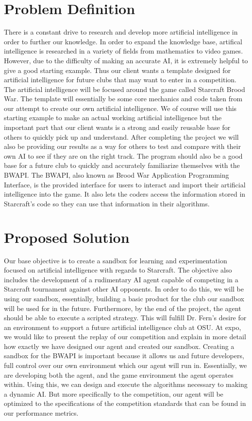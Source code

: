 \documentclass[10pt,letterpaper,onecolumn,draftclsnofoot]{IEEEtran}
\begin{document}
\section{Problem Definition}
There is a constant drive to research and develop more artificial intelligence in order to further our knowledge. In order to expand the knowledge base, artifical intelligence is researched in a variety of fields from mathematics to video games. However, due to the difficulty of making an accurate AI, it is extremely helpful to give a good starting example. Thus our client wants a template designed for artificial intelligence for future clubs that may want to enter in a competition. The artificial intelligence will be focused around the game called Starcraft Brood War. The template will essentially be some core mechanics and code taken from our attempt to create our own artificial intelligence. We of course will use this starting example to make an actual working artificial intelligence but the important part that our client wants is a strong and easily reusable base for others to quickly pick up and understand. After completing the project we will also be providing our results as a way for others to test and compare with their own AI to see if they are on the right track. The program should also be a good base for a future club to quickly and accurately familiarize themselves with the BWAPI. The BWAPI, also known as Brood War Application Programming Interface, is the provided interface for users to interact and import their artificial intelligence into the game. It also lets the coders access the information stored in Starcraft's code so they can use that information in their algorithms.

\section{Proposed Solution}
Our base objective is to create a sandbox for learning and experimentation focused on artificial intelligence with regards to Starcraft. The objective also includes the development of a rudimentary AI agent capable of competing in a Starcraft tournament against other AI opponents. In order to do this, we will be using our sandbox, essentially, building a basic product for the club our sandbox will be used for in the future. Furthermore, by the end of the project, the agent should be able to execute a scripted strategy. This will fulfill Dr. Fern's desire for an environment to support a future artificial intelligence club at OSU. At expo, we would like to present the replay of our competition and explain in more detail how exactly we have designed our agent and created our sandbox.
Creating a sandbox for the BWAPI is important because it allows us and future developers, full control over our own environment which our agent will run in. Essentially, we are developing both the agent, and the game environment the agent operates within. Using this, we can design and execute the algorithms necessary to making a dynamic AI. But more specifically to the competition, our agent will be optimized to the specifications of the competition standards that can be found in our performance metrics. 
\end{document}
